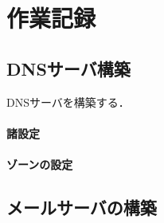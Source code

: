 \section{作業記録}
\subsection{DNSサーバ構築}
DNSサーバを構築する．
\paragraph{諸設定}
\paragraph{ゾーンの設定}
\subsection{メールサーバの構築}